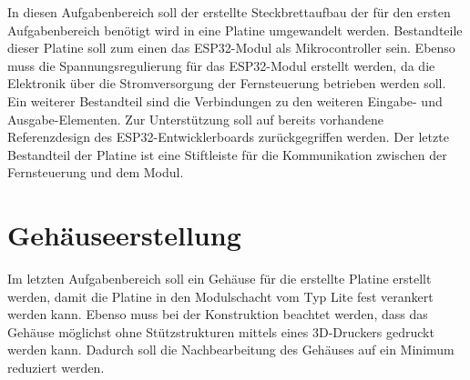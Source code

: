 In diesen Aufgabenbereich soll der erstellte Steckbrettaufbau der für den ersten Aufgabenbereich benötigt wird in eine Platine umgewandelt werden. Bestandteile dieser Platine soll zum einen das ESP32-Modul als Mikrocontroller sein. Ebenso muss die Spannungsregulierung für das ESP32-Modul erstellt werden, da die Elektronik über die Stromversorgung der Fernsteuerung betrieben werden soll. Ein weiterer Bestandteil sind die Verbindungen zu den weiteren Eingabe- und Ausgabe-Elementen. Zur Unterstützung soll auf bereits vorhandene Referenzdesign des ESP32-Entwicklerboards zurückgegriffen werden. Der letzte Bestandteil der Platine ist eine Stiftleiste für die Kommunikation zwischen der Fernsteuerung und dem Modul.

\section{Gehäuseerstellung}

Im letzten Aufgabenbereich soll ein Gehäuse für die erstellte Platine erstellt werden, damit die Platine in den Modulschacht vom Typ Lite fest verankert werden kann. Ebenso muss bei der Konstruktion beachtet werden, dass das Gehäuse möglichst ohne Stützstrukturen mittels eines 3D-Druckers gedruckt werden kann. Dadurch soll die Nachbearbeitung des Gehäuses auf ein Minimum reduziert werden.